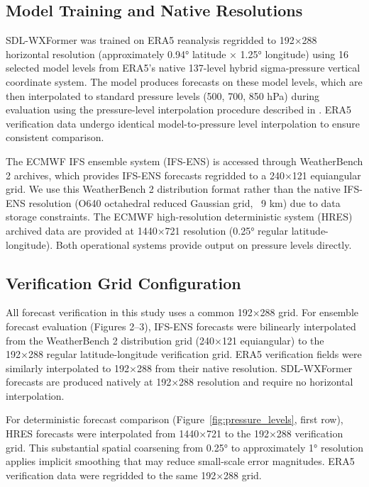 \documentclass[11pt]{article}
\begin{document}
\subsection{Model Training and Native Resolutions}

SDL-WXFormer was trained on ERA5 reanalysis regridded to 192×288 horizontal resolution (approximately 0.94° latitude × 1.25° longitude) using 16 selected model levels from ERA5's native 137-level hybrid sigma-pressure vertical coordinate system. The model produces forecasts on these model levels, which are then interpolated to standard pressure levels (500, 700, 850 hPa) during evaluation using the pressure-level interpolation procedure described in \cite{schreck2025}. ERA5 verification data undergo identical model-to-pressure level interpolation to ensure consistent comparison.

The ECMWF IFS ensemble system (IFS-ENS) is accessed through WeatherBench 2 archives, which provides IFS-ENS forecasts regridded to a 240×121 equiangular grid. We use this WeatherBench 2 distribution format rather than the native IFS-ENS resolution (O640 octahedral reduced Gaussian grid, ~9 km) due to data storage constraints. The ECMWF high-resolution deterministic system (HRES) archived data are provided at 1440×721 resolution (0.25° regular latitude-longitude). Both operational systems provide output on pressure levels directly.

\subsection{Verification Grid Configuration}

All forecast verification in this study uses a common 192×288 grid. For ensemble forecast evaluation (Figures 2–3), IFS-ENS forecasts were bilinearly interpolated from the WeatherBench 2 distribution grid (240×121 equiangular) to the 192×288 regular latitude-longitude verification grid. ERA5 verification fields were similarly interpolated to 192×288 from their native resolution. SDL-WXFormer forecasts are produced natively at 192×288 resolution and require no horizontal interpolation.

For deterministic forecast comparison (Figure~\ref{fig:pressure_levels}, first row), HRES forecasts were interpolated from 1440×721 to the 192×288 verification grid. This substantial spatial coarsening from 0.25° to approximately 1° resolution applies implicit smoothing that may reduce small-scale error magnitudes. ERA5 verification data were regridded to the same 192×288 grid.
\end{document}

